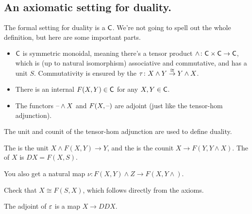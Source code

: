 \subsection*{An axiomatic setting for duality.}
The formal setting for duality is a  $\mathsf C$. We're not going to spell out
the whole definition, but here are some important parts.
\begin{itemize}
	\item $\mathsf C$ is symmetric monoidal, meaning there's a tensor product $\wedge\colon\mathsf C\times\mathsf C\to\mathsf C$, which is
	(up to natural isomorphism) associative and commutative, and has a unit $S$. Commutativity is ensured by the
	 $\tau\colon X\wedge Y\stackrel\cong\to Y\wedge X$.
	\item There is an internal  $F(X,Y)\in\mathsf C$ for any $X,Y\in\mathsf C$.
	\item The functors $\text{--}\wedge X$ and $F(X,\text{--})$ are adjoint (just like the tensor-hom adjunction).
\end{itemize}
The unit and counit of the tensor-hom adjunction are used to define duality.
\begin{defn}
The  is the unit $X\wedge F(X,Y)\to Y$, and the  is the counit $X\to
F(Y,Y\wedge X)$. The  of $X$ is $DX = F(X,S)$.
\end{defn} %
You also get a natural map $\nu\colon F(X,Y)\wedge Z\to F(X,Y\wedge )$.
\begin{ex}
Check that $X\cong F(S,X)$, which follows directly from the axioms.
\end{ex}
The adjoint of $\varepsilon$ is a map $X\to DDX$.

